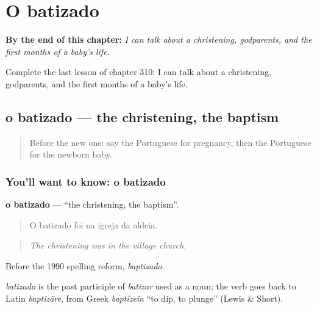 
\chapter{O batizado}
\label{ch:pt-o-batizado}

\begin{chapteropening}
\textbf{By the end of this chapter:} \emph{I can talk about a christening, godparents, and the first months of a baby’s life.}

Complete the last lesson of chapter 310: I can talk about a christening, godparents, and the first months of a baby’s life.
\end{chapteropening}

\section[o batizado]{o batizado — the christening, the baptism}

\label{lesson:PT-C310-batizado}



\begin{quote}
Before the new one: say the Portuguese for pregnancy, then the Portuguese for the newborn baby.
\end{quote}

\subsection*{You'll want to know: o batizado}
\textbf{o batizado} — \textquotedblleft{}the christening, the baptism\textquotedblright{}.

\begin{quote}
O batizado foi na igreja da aldeia.
\end{quote}

\begin{quote}
\emph{The christening was in the village church.}
\end{quote}

Before the 1990 spelling reform, \emph{baptizado}.

\begin{cousinweb}
\emph{batizado} is the past participle of \emph{batizar} used as a noun; the verb goes back to Latin \emph{baptizāre}, from Greek \emph{baptízein} \textquotedblleft{}to dip, to plunge\textquotedblright{} (Lewis \& Short).
\end{cousinweb}

